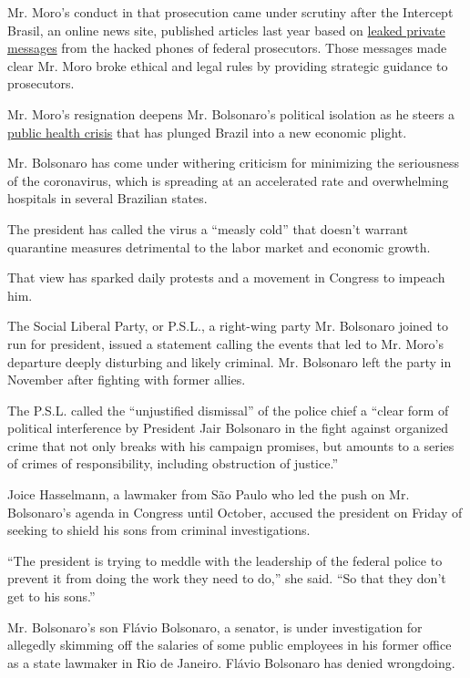 Mr. Moro's conduct in that prosecution came under scrutiny after the
Intercept Brasil, an online news site, published articles last year
based on
\href{https://www.nytimes.com/2019/06/10/world/americas/brazil-car-wash-lava-jato.html}{leaked
private messages} from the hacked phones of federal prosecutors. Those
messages made clear Mr. Moro broke ethical and legal rules by providing
strategic guidance to prosecutors.

Mr. Moro's resignation deepens Mr. Bolsonaro's political isolation as he
steers a
\href{https://www.nytimes.com/2020/04/01/world/americas/brazil-bolsonaro-coronavirus.html}{public
health crisis} that has plunged Brazil into a new economic plight.

Mr. Bolsonaro has come under withering criticism for minimizing the
seriousness of the coronavirus, which is spreading at an accelerated
rate and overwhelming hospitals in several Brazilian states.

The president has called the virus a ``measly cold'' that doesn't
warrant quarantine measures detrimental to the labor market and economic
growth.

That view has sparked daily protests and a movement in Congress to
impeach him.

The Social Liberal Party, or P.S.L., a right-wing party Mr. Bolsonaro
joined to run for president, issued a statement calling the events that
led to Mr. Moro's departure deeply disturbing and likely criminal. Mr.
Bolsonaro left the party in November after fighting with former allies.

The P.S.L. called the ``unjustified dismissal'' of the police chief a
``clear form of political interference by President Jair Bolsonaro in
the fight against organized crime that not only breaks with his campaign
promises, but amounts to a series of crimes of responsibility, including
obstruction of justice.''

Joice Hasselmann, a lawmaker from São Paulo who led the push on Mr.
Bolsonaro's agenda in Congress until October, accused the president on
Friday of seeking to shield his sons from criminal investigations.

``The president is trying to meddle with the leadership of the federal
police to prevent it from doing the work they need to do,'' she said.
``So that they don't get to his sons.''

Mr. Bolsonaro's son Flávio Bolsonaro, a senator, is under investigation
for allegedly skimming off the salaries of some public employees in his
former office as a state lawmaker in Rio de Janeiro. Flávio Bolsonaro
has denied wrongdoing.

